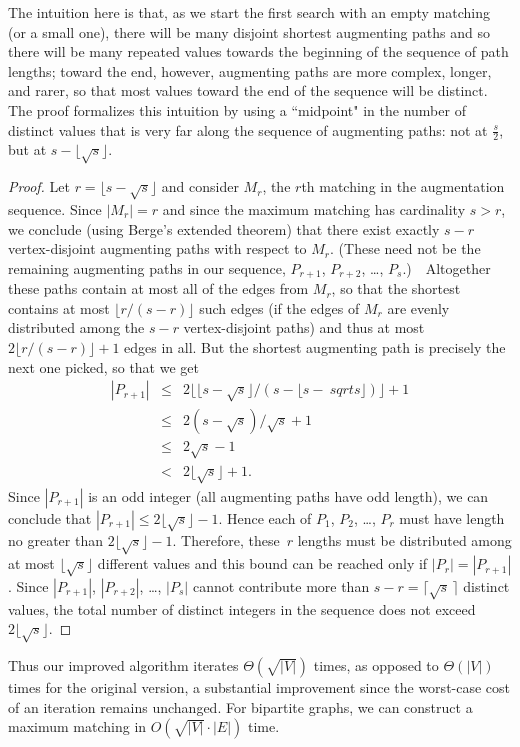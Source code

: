 \documentclass[11pt]{article}
\begin{document}
The intuition here is that, as we start the first search with an empty
matching (or a small one), there will be many disjoint shortest augmenting
paths and so there will be many repeated values towards the beginning of
the sequence of path lengths; toward the end, however, augmenting paths
are more complex, longer, and rarer, so that most values toward the end
of the sequence will be distinct.  The proof formalizes this intuition
by using a ``midpoint" in the number of distinct values that is very far
along the sequence of augmenting paths: not at $\frac{s}{2}$, but at
$s-\lfloor\sqrt{s}\rfloor$.
\begin{proof}
  Let $r = \lfloor s-\sqrt{s} \rfloor$ and consider $M_r$, the $r$th matching
  in the augmentation sequence.  Since $|M_r| = r$ and since the maximum
  matching has cardinality $s > r$, we conclude (using Berge's extended
  theorem) that there
  exist exactly $s-r$ vertex-disjoint augmenting paths with respect to $M_r$.
  (These need not be the remaining augmenting paths in our sequence,
  $P_{r+1}$, $P_{r+2}$, \dots, $P_s$.)\ \ Altogether these paths contain
  at most all of the edges from $M_r$, so that the shortest contains at most
  $\lfloor r/(s-r) \rfloor$ such edges (if the edges of $M_r$ are evenly
  distributed among the $s-r$ vertex-disjoint paths) and thus at most
  $2\lfloor r/(s-r) \rfloor +1$ edges in all.  But the shortest augmenting
  path is precisely the next one picked, so that we get
  \begin{eqnarray*}
    |P_{r+1}| & \leq & 2 \big\lfloor \lfloor s-\sqrt{s} \rfloor / (s-\lfloor s-\
sqrt{s}\rfloor) \big\rfloor + 1 \\
              & \leq & 2(s-\sqrt{s})/\sqrt{s} + 1\\
              & \leq & 2\sqrt{s} - 1\\
              &  <   & 2\lfloor\sqrt{s}\rfloor + 1.
  \end{eqnarray*}
  Since $|P_{r+1}|$ is an odd integer (all augmenting paths have odd length),
  we can conclude that $|P_{r+1}| \leq 2\lfloor\sqrt{s}\rfloor - 1$.
  Hence each of $P_1$, $P_2$, \dots, $P_r$ must have length no greater
  than $2\lfloor\sqrt{s}\rfloor - 1$.  Therefore, these~$r$ lengths
  must be distributed among at most $\lfloor\sqrt{s}\rfloor$ different values
  and this bound can be reached only if $|P_r| = |P_{r+1}|$.
  Since $|P_{r+1}|$, $|P_{r+2}|$, \dots, $|P_s|$
  cannot contribute more than $s-r = \lceil\sqrt{s}\,\rceil$ distinct values,
  the total number of distinct integers in the sequence does not exceed
  $2\lfloor\sqrt{s}\rfloor$.
\end{proof}
Thus our improved algorithm iterates $\Theta(\sqrt{|V|})$ times, as opposed
to $\Theta(|V|)$ times for the original version, a substantial
improvement since the worst-case cost of an iteration remains unchanged.
For bipartite graphs, we can construct a maximum matching in
$O(\sqrt{|V|}\cdot|E|)$ time.
\end{document}
